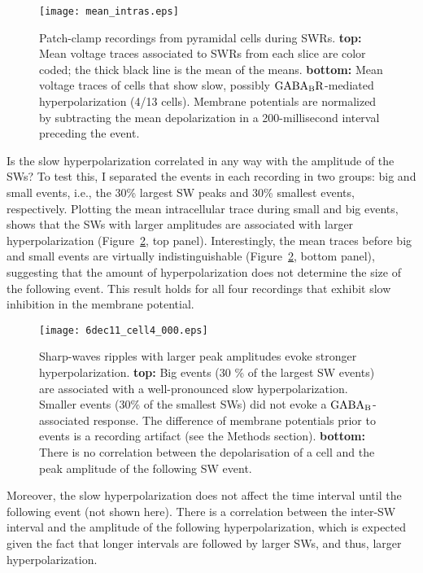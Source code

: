    \begin{figure}
      \center
      \texttt{[image: mean\_intras.eps]}
      \caption{ 
        Patch-clamp recordings from pyramidal cells during SWRs. {\bf top:}
        Mean voltage traces associated to SWRs from each slice are color coded;
        the thick black line is the mean of the means. {\bf bottom:} Mean
        voltage traces of cells that show slow, possibly $\rm GABA_BR$-mediated
        hyperpolarization (4/13 cells). Membrane potentials are normalized by
        subtracting the mean depolarization in a 200-millisecond interval
        preceding the event.
              }
      \label{fig:intra_means}
    \end{figure}

    Is the slow hyperpolarization correlated in any way with the amplitude of
    the SWs? To test this, I separated the events in each recording in two
    groups: big and small events, i.e., the 30\% largest SW peaks and 30\%
    smallest events, respectively. Plotting the mean intracellular trace during
    small and big events, shows that the SWs with larger amplitudes are
    associated with larger hyperpolarization (Figure~\ref{fig:intra_big_small},
    top panel). Interestingly, the mean traces before big and small events are
    virtually indistinguishable (Figure~\ref{fig:intra_big_small}, bottom
    panel), suggesting that the amount of hyperpolarization does not determine the size
    of the following event. This result holds for all four recordings that
    exhibit slow inhibition in the membrane potential.
    
    \begin{figure}
      \center
      \texttt{[image: 6dec11\_cell4\_000.eps]}
      \caption{ 
        Sharp-waves ripples with larger peak amplitudes evoke stronger
        hyperpolarization. {\bf top:} Big events (30 \% of the largest SW
        events) are associated with a well-pronounced slow hyperpolarization.
        Smaller events (30\% of the smallest SWs) did not evoke a $\rm
        GABA_B$-associated response. The difference of membrane potentials
        prior to events is a recording artifact (see the Methods section). {\bf
        bottom:} There is no correlation between the depolarisation of a cell
        and the peak amplitude of the following SW event.
              }
      \label{fig:intra_big_small}
    \end{figure}

    Moreover, the slow hyperpolarization does not affect the time interval
    until the following event (not shown here). There is a correlation between
    the inter-SW interval and the amplitude of the following hyperpolarization,
    which is expected given the fact that longer intervals are followed by
    larger SWs, and thus, larger hyperpolarization.


